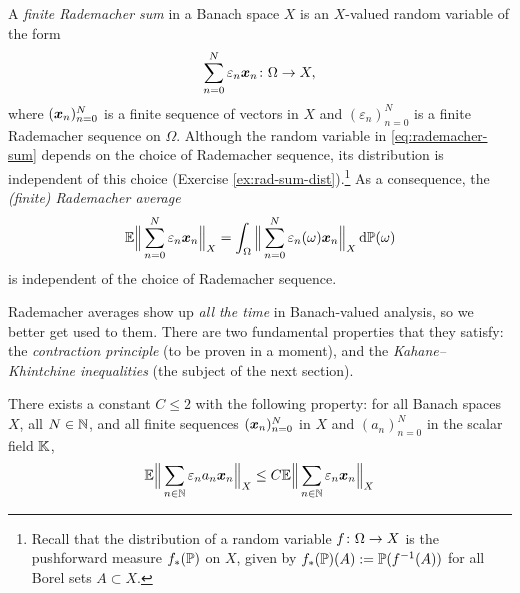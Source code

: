 A \emph{finite Rademacher sum} in a Banach space $X$ is an $X$-valued random variable of the form
\begin{equation}\label{eq:rademacher-sum}
  \sum_{n = 0}^{N} \varepsilon_n \mb{x}_{n} \colon \Omega \to X,
\end{equation}
where $(\mb{x}_{n})_{n = 0}^{N}$ is a finite sequence of vectors in $X$ and $(\varepsilon_{n})_{n = 0}^{N}$ is a finite Rademacher sequence on $\Omega$.
Although the random variable in \eqref{eq:rademacher-sum} depends on the choice of Rademacher sequence, its distribution is independent of this choice (Exercise \ref{ex:rad-sum-dist}).\footnote{Recall that the distribution of a random variable $\map{f}{\Omega}{X}$ is the pushforward measure $f_{*}(\P)$ on $X$, given by $f_{*}(\P)(A) := \P(f^{-1}(A))$ for all Borel sets $A \subset X$.}
As a consequence, the \emph{(finite) Rademacher average}
\begin{equation*}
  \E \Big\| \sum_{n = 0}^{N} \varepsilon_{n} \mb{x}_{n} \Big\|_{X} = \int_{\Omega}  \Big\| \sum_{n = 0}^{N} \varepsilon_{n}(\omega) \mb{x}_{n} \Big\|_{X} \, \dd\P(\omega)
\end{equation*}
is independent of the choice of Rademacher sequence.

Rademacher averages show up \emph{all the time} in Banach-valued analysis, so we better get used to them.
There are two fundamental properties that they satisfy: the \emph{contraction principle} (to be proven in a moment), and the \emph{Kahane--Khintchine inequalities} (the subject of the next section).

\begin{thm}
  There exists a constant $C \leq 2$ with the following property: for all Banach spaces $X$, all $N \in \N$, and all finite sequences $(\mb{x}_{n})_{n = 0}^{N}$ in $X$ and $(a_{n})_{n=0}^{N}$ in the scalar field $\K$,
  \begin{equation*}
    \E \Big\| \sum_{n \in \N} \varepsilon_{n} a_{n} \mb{x}_{n} \Big\|_{X} \leq C \E \Big\| \sum_{n \in \N} \varepsilon_{n} \mb{x}_{n} \Big\|_{X}
  \end{equation*}
\end{thm}

